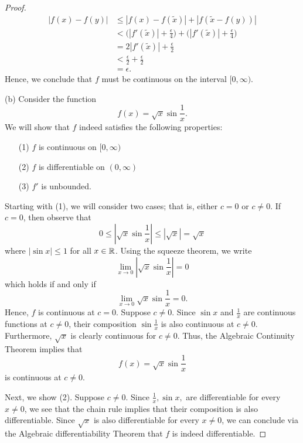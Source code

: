 \documentclass[a4paper]{article}
\begin{document}
\begin{proof}
\begin{align*}
        | f(x) - f(y) | &\leq | f(x) - f(\tilde{x}) | + | f(\tilde{x} - f(y)) |  \\
                        &< \Big(  | f'(\tilde{x}) | + \frac{ \epsilon }{ 4 }  \Big) + \Big(  | f'(\tilde{x}) | + \frac{ \epsilon }{ 4 }  \Big) \\
                        &= 2 | f'(\tilde{x}) |  + \frac{ \epsilon }{ 2 } \\ 
                        &< \frac{ \epsilon }{ 2 }  + \frac{ \epsilon }{ 2 }  \\
                        &= \epsilon.
    \end{align*}
    Hence, we conclude that \( f  \) must be continuous on the interval \( [0,\infty ) \).
\item[(b)] Consider the function 
    \[  f(x) = \sqrt{ x } \sin \frac{ 1 }{ x }. \]
    We will show that \( f  \) indeed satisfies the following properties:
    \begin{enumerate}
        \item[(1)] \( f  \) is continuous on \( [0,\infty ) \)
        \item[(2)] \( f  \) is differentiable on \( (0,\infty ) \)
        \item[(3)] \( f'  \) is unbounded.
    \end{enumerate}
    Starting with (1), we will consider two cases; that is, either \( c = 0  \) or \( c \neq 0  \). If \( c = 0  \), then observe that 
    \[  0 \leq | \sqrt{ x } \sin \frac{ 1 }{ x }  |  \leq | \sqrt{ x }  | = \sqrt{ x }  \]
    where \( |  \sin x  |  \leq 1  \) for all \( x \in \mathbb{R}  \). Using the squeeze theorem, we write
    \[  \lim_{ x \to 0 }  | \sqrt{ x  }  \sin \frac{ 1 }{ x }  | = 0  \]
    which holds if and only if 
    \[  \lim_{ x \to 0 } \sqrt{ x }  \sin \frac{ 1 }{ x }  = 0.  \]
    Hence, \( f  \) is continuous at \( c = 0  \). Suppose \( c \neq 0  \). Since \( \sin x  \) and \( \frac{ 1 }{ x }  \) are continuous functions at \( c \neq 0  \), their composition \( \sin \frac{ 1 }{ x }  \) is also continuous at \( c \neq 0  \). Furthermore, \( \sqrt{ x  }   \) is clearly continuous for \( c \neq 0  \). Thus, the Algebraic Continuity Theorem implies that 
    \[  f(x) = \sqrt{  x  }  \sin \frac{ 1 }{ x }  \]
    is continuous at \( c \neq 0  \).

    Next, we show (2). Suppose \( c \neq 0  \). Since \( \frac{ 1 }{ x }, \sin x,   \) are differentiable for every \( x \neq 0  \), we see that the chain rule implies that their composition is also differentiable. Since \( \sqrt{ x  }   \) is also differentiable for every \( x \neq 0  \), we can conclude via the Algebraic differentiability Theorem that \( f \) is indeed differentiable.


\end{proof}
\end{document}
